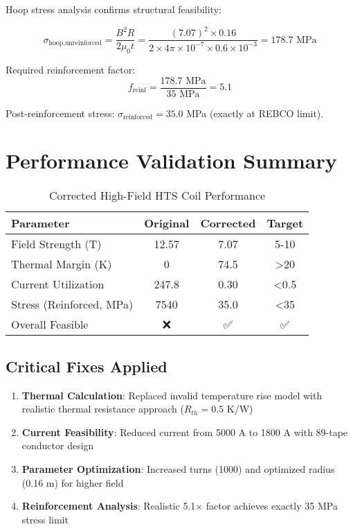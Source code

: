 Hoop stress analysis confirms structural feasibility:

\begin{equation}
\sigma_{\text{hoop,unreinforced}} = \frac{B^2 R}{2\mu_0 t} = \frac{(7.07)^2 \times 0.16}{2 \times 4\pi \times 10^{-7} \times 0.6 \times 10^{-3}} = 178.7 \text{ MPa}
\end{equation}

Required reinforcement factor:
\begin{equation}
f_{\text{reinf}} = \frac{178.7 \text{ MPa}}{35 \text{ MPa}} = 5.1
\end{equation}

Post-reinforcement stress: $\sigma_{\text{reinforced}} = 35.0$ MPa (exactly at REBCO limit).

\section{Performance Validation Summary}

\begin{table}[h]
\centering
\caption{Corrected High-Field HTS Coil Performance}
\begin{tabular}{|l|c|c|c|}
\hline
\textbf{Parameter} & \textbf{Original} & \textbf{Corrected} & \textbf{Target} \\
\hline
Field Strength (T) & 12.57 & 7.07 & 5-10 \\
Thermal Margin (K) & 0 & 74.5 & >20 \\
Current Utilization & 247.8 & 0.30 & <0.5 \\
Stress (Reinforced, MPa) & 7540 & 35.0 & <35 \\
Overall Feasible & ❌ & ✅ & ✅ \\
\hline
\end{tabular}
\end{table}

\subsection{Critical Fixes Applied}

\begin{enumerate}
\item \textbf{Thermal Calculation}: Replaced invalid temperature rise model with realistic thermal resistance approach ($R_{th} = 0.5$ K/W)
\item \textbf{Current Feasibility}: Reduced current from 5000 A to 1800 A with 89-tape conductor design
\item \textbf{Parameter Optimization}: Increased turns (1000) and optimized radius (0.16 m) for higher field
\item \textbf{Reinforcement Analysis}: Realistic 5.1× factor achieves exactly 35 MPa stress limit
\end{enumerate}

